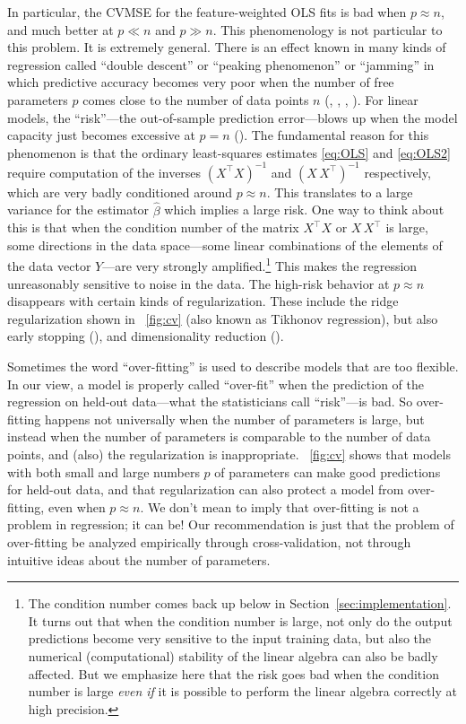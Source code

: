 \documentclass[12pt,letterpaper]{article}
\newcommand{\sectionname}{Section}
\begin{document}
In particular, the CVMSE for the feature-weighted OLS fits is bad when $p\approx n$, and much better at $p\ll n$ and $p \gg n$.
This phenomenology is not particular to this problem.
It is extremely general.
There is an effect known in many kinds of regression called ``double descent'' or ``peaking phenomenon'' or ``jamming'' in which predictive accuracy becomes very poor when the number of free parameters $p$ comes close to the number of data points $n$ (\citealt{jain198239}, \citealt{belkin2019reconciling}, \citealt{spigler2018jamming}, \citealt{geiger2019jamming}). For linear models, the ``risk''---the out-of-sample prediction error---blows up when the model capacity just becomes excessive at $p=n$ (\citealt{hastie2019surprises}).
The fundamental reason for this phenomenon is that the ordinary least-squares estimates \eqref{eq:OLS} and \eqref{eq:OLS2} require computation of the inverses $(X^\top X)^{-1}$ and $(X\,X^\top)^{-1}$ respectively, which are very badly conditioned around $p\approx n$.
This translates to a large variance for the estimator $\hat \beta$ which implies a large risk.
One way to think about this is that when the condition number of the matrix $X^\top X$ or $X\,X^\top$ is large, some directions in the data space---some linear combinations of the elements of the data vector $Y$---are very strongly amplified.\footnote{The condition number comes back up below in \sectionname~\ref{sec:implementation}. It turns out that when the condition number is large, not only do the output predictions become very sensitive to the input training data, but also the numerical (computational) stability of the linear algebra can also be badly affected. But we emphasize here that the risk goes bad when the condition number is large \emph{even if} it is possible to perform the linear algebra correctly at high precision.}
This makes the regression unreasonably sensitive to noise in the data.
The high-risk behavior at $p\approx n$ disappears with certain kinds of regularization.
These include the ridge regularization shown in \figurename~\ref{fig:cv} (also known as Tikhonov regression), but also early stopping (\citealt{hastie2019surprises}), and dimensionality reduction (\citealt{huang2020dimensionality}).

Sometimes the word ``over-fitting'' is used to describe models that are too flexible.
In our view, a model is properly called ``over-fit'' when the prediction of the regression on held-out data---what the statisticians call ``risk''---is bad.
So over-fitting happens not universally when the number of parameters is large, but instead when the number of parameters is comparable to the number of data points, and (also) the regularization is inappropriate.
\figurename~\ref{fig:cv} shows that models with both small and large numbers $p$ of parameters can make good predictions for held-out data, and that regularization can also protect a model from over-fitting, even when $p\approx n$.
We don't mean to imply that over-fitting is not a problem in regression; it can be!
Our recommendation is just that the problem of over-fitting be analyzed empirically through cross-validation, not through intuitive ideas about the number of parameters.
\end{document}
